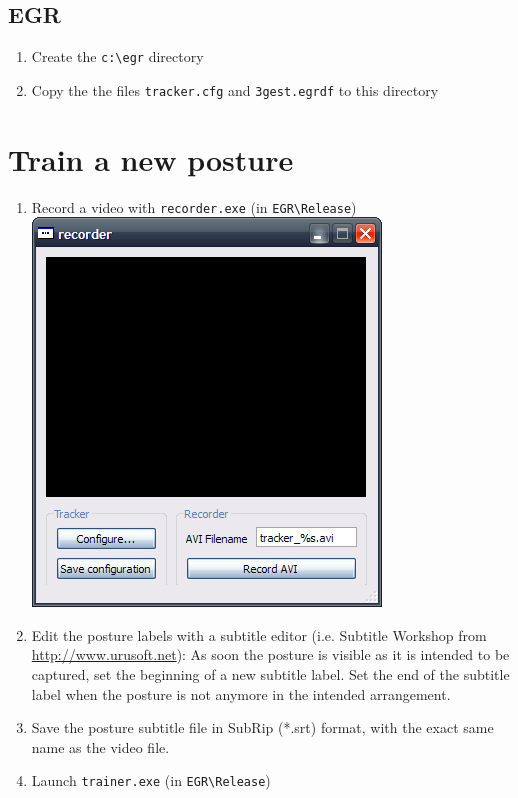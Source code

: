 \subsection*{EGR}
\begin{enumerate}
\item Create the \texttt{c:\textbackslash egr} directory
\item Copy the the files \texttt{tracker.cfg} and \texttt{3gest.egrdf} to this directory
\end{enumerate}
\clearpage

\section*{Train a new posture}
\begin{enumerate}
\item Record a video with \texttt{recorder.exe} (in \texttt{EGR\textbackslash Release})\\
\includegraphics[scale=0.75]{images/recorder} 
\item Edit the posture labels with a subtitle editor (i.e. Subtitle Workshop from \url{http://www.urusoft.net}):
As soon the posture is visible as it is intended to be captured, set the beginning of a new subtitle label. Set the end of the subtitle label when the posture is not anymore in the intended arrangement.
\item Save the posture subtitle file in SubRip (*.srt) format, with the exact same name as the video file.
\item Launch \texttt{trainer.exe} (in \texttt{EGR\textbackslash Release}) \\

\end{enumerate}
